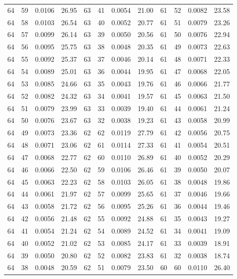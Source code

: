 \begin{tabular}{llll|llll|llll}
64 & 59 & 0.0106 & 26.95 & 63 & 41 & 0.0054 & 21.00 & 61 & 52 & 0.0082 & 23.58\\
64 & 58 & 0.0103 & 26.54 & 63 & 40 & 0.0052 & 20.77 & 61 & 51 & 0.0079 & 23.26\\
64 & 57 & 0.0099 & 26.14 & 63 & 39 & 0.0050 & 20.56 & 61 & 50 & 0.0076 & 22.94\\
64 & 56 & 0.0095 & 25.75 & 63 & 38 & 0.0048 & 20.35 & 61 & 49 & 0.0073 & 22.63\\
64 & 55 & 0.0092 & 25.37 & 63 & 37 & 0.0046 & 20.14 & 61 & 48 & 0.0071 & 22.33\\
64 & 54 & 0.0089 & 25.01 & 63 & 36 & 0.0044 & 19.95 & 61 & 47 & 0.0068 & 22.05\\
64 & 53 & 0.0085 & 24.66 & 63 & 35 & 0.0043 & 19.76 & 61 & 46 & 0.0066 & 21.77\\
64 & 52 & 0.0082 & 24.32 & 63 & 34 & 0.0041 & 19.57 & 61 & 45 & 0.0063 & 21.50\\
64 & 51 & 0.0079 & 23.99 & 63 & 33 & 0.0039 & 19.40 & 61 & 44 & 0.0061 & 21.24\\
64 & 50 & 0.0076 & 23.67 & 63 & 32 & 0.0038 & 19.23 & 61 & 43 & 0.0058 & 20.99\\
64 & 49 & 0.0073 & 23.36 & 62 & 62 & 0.0119 & 27.79 & 61 & 42 & 0.0056 & 20.75\\
64 & 48 & 0.0071 & 23.06 & 62 & 61 & 0.0114 & 27.33 & 61 & 41 & 0.0054 & 20.51\\
64 & 47 & 0.0068 & 22.77 & 62 & 60 & 0.0110 & 26.89 & 61 & 40 & 0.0052 & 20.29\\
64 & 46 & 0.0066 & 22.50 & 62 & 59 & 0.0106 & 26.46 & 61 & 39 & 0.0050 & 20.07\\
64 & 45 & 0.0063 & 22.23 & 62 & 58 & 0.0103 & 26.05 & 61 & 38 & 0.0048 & 19.86\\
64 & 44 & 0.0061 & 21.97 & 62 & 57 & 0.0099 & 25.65 & 61 & 37 & 0.0046 & 19.66\\
64 & 43 & 0.0058 & 21.72 & 62 & 56 & 0.0095 & 25.26 & 61 & 36 & 0.0044 & 19.46\\
64 & 42 & 0.0056 & 21.48 & 62 & 55 & 0.0092 & 24.88 & 61 & 35 & 0.0043 & 19.27\\
64 & 41 & 0.0054 & 21.24 & 62 & 54 & 0.0089 & 24.52 & 61 & 34 & 0.0041 & 19.09\\
64 & 40 & 0.0052 & 21.02 & 62 & 53 & 0.0085 & 24.17 & 61 & 33 & 0.0039 & 18.91\\
64 & 39 & 0.0050 & 20.80 & 62 & 52 & 0.0082 & 23.83 & 61 & 32 & 0.0038 & 18.74\\
64 & 38 & 0.0048 & 20.59 & 62 & 51 & 0.0079 & 23.50 & 60 & 60 & 0.0110 & 26.40\\

\end{tabular}
